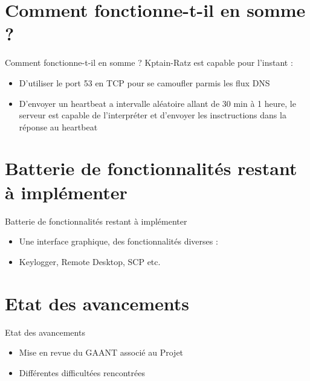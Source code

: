 \documentclass{beamer}
\begin{document}
\section{Comment fonctionne-t-il en somme ?}
  \begin{frame}{Comment fonctionne-t-il en somme ?}
	Kptain-Ratz est capable pour l'instant :
  \begin{itemize}
	\item D'utiliser le port 53 en TCP pour se camoufler parmis les flux DNS
	\item D'envoyer un heartbeat a intervalle aléatoire allant de 30 min à 1 heure, le serveur est capable de l'interpréter et d'envoyer les insctructions dans la réponse au heartbeat
  \end{itemize}
  \end{frame}

\section{Batterie de fonctionnalités restant à implémenter}
  \begin{frame}{Batterie de fonctionnalités restant à implémenter}
  \begin{itemize}
	\item Une interface graphique, des fonctionnalités diverses :
	\item Keylogger, Remote Desktop, SCP etc.
  \end{itemize}
  \end{frame}


\section{Etat des avancements}
  \begin{frame}{Etat des avancements}
  \begin{itemize}
	\item Mise en revue du GAANT associé au Projet 
	\item Différentes difficultées rencontrées
  \end{itemize}
  \end{frame}
\end{document}
